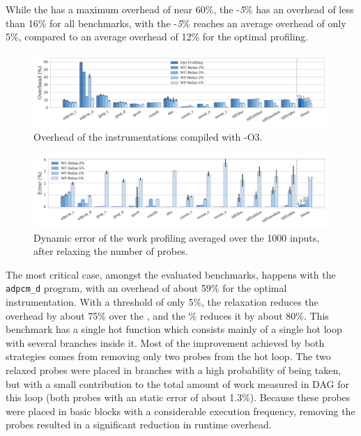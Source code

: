 
While the \OptProf has a maximum overhead of near 60\%, the \WCRelax-\textit{5}\% has an overhead of
less than 16\% for all benchmarks, with the \WPRelax-\textit{5}\% reaches an average overhead of only 5\%,
compared to an average overhead of 12\% for the optimal profiling.

\begin{figure}[t!]
    \centering
    \includegraphics[width=\textwidth]{figs/overhead-O3.pdf}
    \caption{Overhead of the instrumentations compiled with {\flagstype -O3}.}
    \label{fig:overhead-O3}
\end{figure}
\begin{figure}[t!]
    \centering
    \includegraphics[width=\textwidth]{figs/error-O3.pdf}
    \caption{Dynamic error of the work profiling averaged over the 1000 inputs, after relaxing the number of probes.}
    \label{fig:error-O3}
\end{figure}


The most critical case, amongst the evaluated benchmarks, happens with the
\texttt{adpcm\_d} program, with an overhead of about 59\% for the optimal
instrumentation.
With a threshold of only 5\%, the \WCRelaxLower relaxation reduces
the overhead by about 75\% over the \OptProf,
and the \% reduces it by about 80\%.
This benchmark has a single hot function
which consists mainly of a single hot loop with several branches inside it. %
Most of the improvement achieved by both strategies comes from removing only two probes from the hot loop. The two relaxed probes were
placed in branches with a high probability of being taken, but with a small contribution to the total amount of
work measured in DAG for this loop (both probes with an static error of about 1.3\%). Because these probes were placed in basic blocks with
a considerable execution frequency, removing the probes resulted in a significant reduction in runtime overhead.

